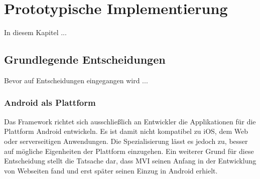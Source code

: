 \section{Prototypische Implementierung}
\label{sec:prototypische-implementierungt}
In diesem Kapitel ...

\subsection{Grundlegende Entscheidungen}
Bevor auf Entscheidungen eingegangen wird ...

\subsubsection{Android als Plattform}
Das Framework richtet sich ausschließlich an Entwickler die Applikationen für die Plattform Android entwickeln. Es ist damit nicht kompatibel zu iOS, dem Web oder serverseitigen Anwendungen. Die Spezialisierung lässt es jedoch zu, besser auf mögliche Eigenheiten der Plattform einzugehen. Ein weiterer Grund für diese Entscheidung stellt die Tatsache dar, dass MVI seinen Anfang in der Entwicklung von Webseiten fand und erst später seinen Einzug in Android erhielt.

